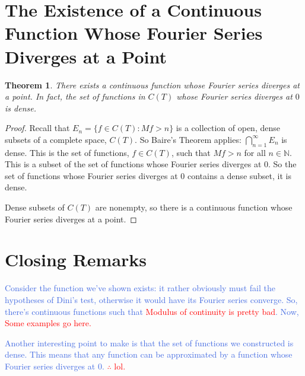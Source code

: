 \documentclass{amsart}
\newcommand{\N}{\mathbb{N}}
\newcommand{\colorcomment}[2]{\textcolor{#1}{#2}} %
\newtheorem{thm}{Theorem}[section]
\theoremstyle{definition}
\begin{document}
\section{The Existence of a Continuous Function Whose Fourier Series Diverges at a Point}

\begin{thm}
There exists a continuous function whose Fourier series diverges at a point.
In fact, the set of functions in $C(T)$ whose Fourier series diverges at $0$ is dense.
\end{thm}

\begin{proof}

Recall that 
$E_n = \{f \in C(T) : Mf > n\}$
is a collection of open, dense subsets of a complete space, $C(T)$. 
So Baire's Theorem applies: $\bigcap\limits_{n=1}^\infty E_n $ is dense.
This is the set of functions, $f \in C(T)$, such that $Mf >n$ for all $n \in \N$.
This is a subset of the set of functions whose Fourier series diverges at $0$.
So the set of functions whose Fourier series diverges at $0$ contains a dense subset, it is dense.

Dense subsets of $C(T)$ are nonempty, so there is a continuous function whose Fourier series diverges at a point.

\end{proof}

\section{Closing Remarks}

\colorcomment{RoyalBlue}{Consider the function we've shown exists: it rather obviously must fail the hypotheses of Dini's test, otherwise it would have its Fourier series converge. 
So, there's continuous functions such that \colorcomment{red}{Modulus of continuity is pretty bad}.
Now, \colorcomment{red}{Some examples go here.}}

\colorcomment{RoyalBlue}{Another interesting point to make is that the set of functions we constructed is dense. 
This means that any function can be approximated by a function whose Fourier series diverges at $0$. 
\colorcomment{red}{$\therefore$ lol.}}
\end{document}
